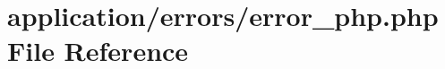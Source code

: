 \hypertarget{error__php_8php}{\section{application/errors/error\-\_\-php.php File Reference}
\label{error__php_8php}
}
